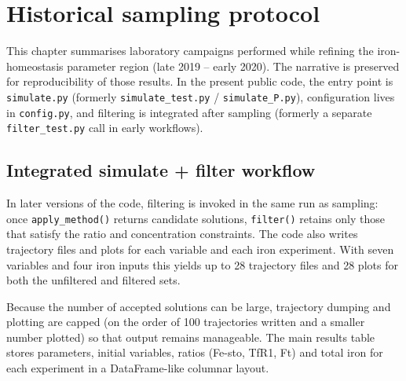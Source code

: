 \chapter{Historical sampling protocol}
\label{chap:protocol}

This chapter summarises laboratory campaigns performed while refining the
iron-homeostasis parameter region (late 2019 -- early 2020). The narrative is
preserved for reproducibility of those results. In the present public code, the
entry point is \texttt{simulate.py} (formerly \texttt{simulate\_test.py} /
\texttt{simulate\_P.py}), configuration lives in \texttt{config.py}, and
filtering is integrated after sampling (formerly a separate
\texttt{filter\_test.py} call in early workflows).

\section{Integrated simulate + filter workflow}
In later versions of the code, filtering is invoked in the same run as sampling:
once \texttt{apply\_method()} returns candidate solutions, \texttt{filter()}
retains only those that satisfy the ratio and concentration constraints. The
code also writes trajectory files and plots for each variable and each iron
experiment. With seven variables and four iron inputs this yields up to
28 trajectory files and 28 plots for both the unfiltered and filtered sets.

Because the number of accepted solutions can be large, trajectory dumping and
plotting are capped (on the order of 100 trajectories written and a smaller
number plotted) so that output remains manageable. The main results table stores
parameters, initial variables, ratios (Fe-sto, TfR1, Ft) and total iron for each
experiment in a DataFrame-like columnar layout.


